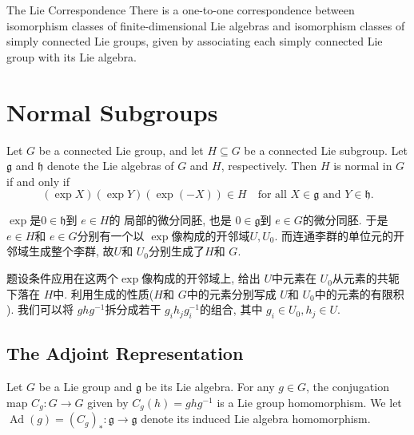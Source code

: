 \documentclass[../main.tex]{subfiles}
\begin{document}
\begin{theorem}{The Lie Correspondence}{}
There is a one-to-one correspondence between isomorphism classes of finite-dimensional Lie algebras and isomorphism classes of simply connected Lie groups, given by associating each simply connected Lie group with its Lie algebra.
\end{theorem}
\section{Normal Subgroups}

\begin{lemma}{}{}
Let $G$ be a connected Lie group, and let $H \subseteq G$ be a connected Lie subgroup. Let $\mathfrak{g}$ and $\mathfrak{h}$ denote the Lie algebras of $G$ and $H$, respectively. Then $H$ is normal in $G$ if and only if
\begin{equation}
(\exp X)(\exp Y)(\exp(-X)) \in H \quad \text{for all } X \in \mathfrak{g} \text{ and } Y \in \mathfrak{h}.
\end{equation}
\end{lemma}

\begin{proofsketch}
    \(  \exp   \)是\(  0\in \mathfrak{h}  \)到 \(  e\in H  \)的  局部的微分同胚, 也是 \(  0\in \mathfrak{g}  \)到 \(  e\in G  \)的微分同胚.  于是 \(  e\in H  \)和 \(  e\in G  \)分别有一个以 \(  \exp   \)像构成的开邻域\(  U,U_0  \). 而连通李群的单位元的开邻域生成整个李群, 故\(  U  \)和 \(  U_0  \)分别生成了\(  H  \)和 \(  G  \).          

    题设条件应用在这两个\(  \exp   \)像构成的开邻域上,  给出 \(  U  \)中元素在 \(  U_0  \)从元素的共轭下落在 \(  H  \)中.  利用生成的性质(\(  H  \)和 \(  G  \)中的元素分别写成 \(  U  \)和 \(  U_0  \)中的元素的有限积    ). 我们可以将 \(  ghg^{-1}   \)拆分成若干 \(  g_{i}h_{j}g_{i}^{-1}   \)的组合, 其中 \(   g_{i}\in U_0, h_{j}\in U \).     
\end{proofsketch}

\subsection{The Adjoint Representation}

\begin{definition}{}{}
    Let \(G\) be a Lie group and \(\mathfrak g\) be its Lie algebra. For any \(g\in G\), the conjugation map \(C_g\colon G\to G\) given by \(C_g(h)=ghg^{-1}\) is a Lie group homomorphism. We let \(\operatorname{Ad}(g)=(C_g)_*\colon \mathfrak g\to\mathfrak g\) denote its induced Lie algebra homomorphism.
\end{definition}
\end{document}
